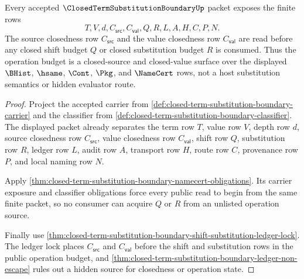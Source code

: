 \begin{theorem}
\label{thm:closed-term-substitution-boundary-closed-source-budget-surface}
Every accepted $\ClosedTermSubstitutionBoundaryUp$ packet exposes the finite rows
$$
T,V,d,C_{\mathsf{src}},C_{\mathsf{val}},Q,R,L,A,H,C,P,N.
$$
The source closedness row $C_{\mathsf{src}}$ and the value closedness row $C_{\mathsf{val}}$ are read before any closed shift budget $Q$ or closed substitution budget $R$ is consumed. Thus the operation budget is a closed-source and closed-value surface over the displayed $\BHist$, $\hsame$, $\Cont$, $\Pkg$, and $\NameCert$ rows, not a host substitution semantics or hidden evaluator route.
\end{theorem}
\begin{proof}
Project the accepted carrier from \autoref{def:closed-term-substitution-boundary-carrier} and the classifier from \autoref{def:closed-term-substitution-boundary-classifier}. The displayed packet already separates the term row $T$, value row $V$, depth row $d$, source closedness row $C_{\mathsf{src}}$, value closedness row $C_{\mathsf{val}}$, shift row $Q$, substitution row $R$, ledger row $L$, audit row $A$, transport row $H$, route row $C$, provenance row $P$, and local naming row $N$.

Apply \autoref{thm:closed-term-substitution-boundary-namecert-obligations}. Its carrier exposure and classifier obligations force every public read to begin from the same finite packet, so no consumer can acquire $Q$ or $R$ from an unlisted operation source.

Finally use \autoref{thm:closed-term-substitution-boundary-shift-substitution-ledger-lock}. The ledger lock places $C_{\mathsf{src}}$ and $C_{\mathsf{val}}$ before the shift and substitution rows in the public operation budget, and \autoref{thm:closed-term-substitution-boundary-ledger-non-escape} rules out a hidden source for closedness or operation state.
\end{proof}

